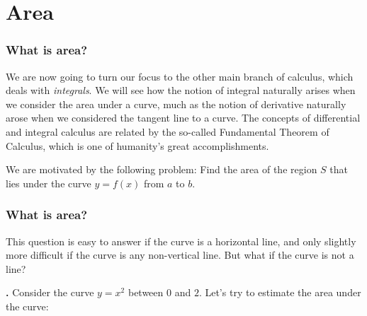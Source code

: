 \documentclass[t]{beamer}
\theoremstyle{plain}
\theoremstyle{definition}
\newcounter{heading}
\newcommand{\makeheading}[1]{\medskip\begin{large}\noindent\textbf{{#1}}\end{large}\smallskip}
\newcommand{\newhead}[1]{\medskip\stepcounter{heading}\noindent\textbf{\hspace{0.2cm}{#1}.}}
\begin{document}
\section{Area}
\begin{frame}
\frametitle{What is area?}
\noindent We are now going to  turn our focus to the other main branch of calculus, which deals with \emph{integrals}.  We will see how the notion of integral naturally arises when we consider the area under a curve, much as the notion of derivative naturally arose when we considered the tangent line to a curve.  The concepts of differential and integral calculus are related by the so-called Fundamental Theorem of Calculus, which is one of humanity's great accomplishments.\pause




\noindent We are motivated by the following problem: Find the area of the region $S$ that lies under the curve $y = f(x)$ from $a$ to $b$.
\end{frame}

\begin{frame}[label=tues]
\frametitle{What is area?}
\noindent This question is easy to answer if the curve is a horizontal line, and only slightly more difficult if the curve is any non-vertical line.  But what if the curve is not a line?

\newhead{Example}
Consider the curve $y=x^{2}$ between $0$ and $2$.  Let's try to estimate the area under the curve:
\end{frame}
\end{document}
